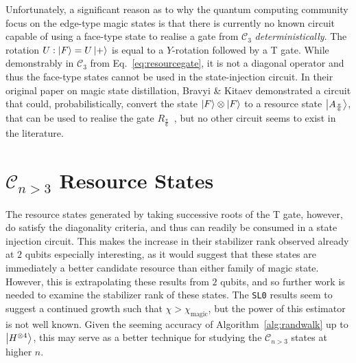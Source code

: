 \documentclass{standalone}
\begin{document}
\par
Unfortunately, a significant reason as to why the quantum computing community focus on the edge-type magic states is that there is currently no known circuit capable of using a face-type state to realise a gate from $\mathcal{C}_{3}$ \emph{deterministically}. The rotation $U:\ket{F}=U\ket{+}$ is equal to a $Y$-rotation followed by a T gate. While demonstrably in $\mathcal{C}_{3}$ from Eq.~\ref{eq:resourcegate}, it is not a diagonal operator and thus the face-type states cannot be used in the state-injection circuit. In their original paper on magic state distillation, Bravyi \& Kitaev demonstrated a circuit that could, probabilistically, convert the state $\ket{F}\otimes\ket{F}$ to a resource state $\ket{A_{\frac{\pi}{6}}}$, that can be used to realise the gate $R_{\frac{\pi}{6}}$~\cite{Bravyi2005}, but no other circuit seems to exist in the literature. 

\section{$\mathcal{C}_{n>3}$ Resource States}
The resource states generated by taking successive roots of the T gate, however, do satisfy the diagonality criteria, and thus can readily be consumed in a state injection circuit. This makes the increase in their stabilizer rank observed already at $2$ qubits especially interesting, as it would suggest that these states are immediately a better candidate resource than either family of magic state. \\
However, this is extrapolating these results from $2$ qubits, and so further work is needed to examine the stabilizer rank of these states. The \texttt{SL0} results seem to suggest a continued growth such that $\chi>\chi_{\text{magic}}$, but the power of this estimator is not well known. Given the seeming accuracy of Algorithm~\ref{alg:randwalk} up to $\ket{H^{\otimes 4}}$, this may serve as a better technique for studying the $\mathcal{C}_{n>3}$ states at higher $n$.
\end{document}

